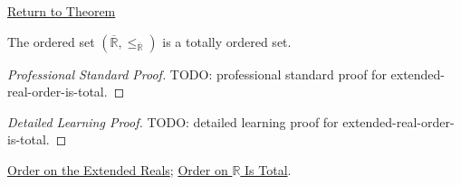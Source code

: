\newpage
{}
\label{prf:extended-real-order-is-total}
\begin{remark*}[Return]
\hyperref[thm:extended-real-order-is-total]{Return to Theorem}
\end{remark*}
\begin{theorem*}
The ordered set $(\overline{\mathbb{R}},\le_{\overline{\mathbb{R}}})$ is a
totally ordered set.
\end{theorem*}
\begin{proof}[Professional Standard Proof]
\LRAProofBodyStart
TODO: professional standard proof for extended-real-order-is-total.
\end{proof}
\begin{proof}[Detailed Learning Proof]
\LRAProofBodyStart
TODO: detailed learning proof for extended-real-order-is-total.
\end{proof}
\begin{remark*}
\end{remark*}
\begin{dependencies}
\hyperref[def:extended-real-order]{Order on the Extended Reals};
\hyperref[thm:order-on-r-total]{Order on $\mathbb{R}$ Is Total}.
\end{dependencies}
\clearpage
